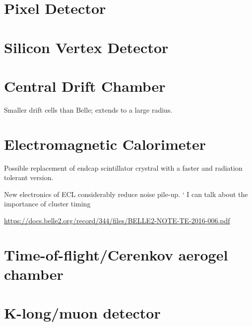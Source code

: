 \documentclass[12pt]{thesis}  %
\begin{document}

\section{Pixel Detector}



\section{Silicon Vertex Detector}




\section{Central Drift Chamber}

Smaller drift cells than Belle; extends to a large radius.



\section{Electromagnetic Calorimeter}

Possible replacement of endcap scintillator crystral with a faster and radiation tolerant version.

New electronics of ECL considerably reduce noise pile-up.
`
I can talk about the importance of cluster timing

\url{https://docs.belle2.org/record/344/files/BELLE2-NOTE-TE-2016-006.pdf}



\section{Time-of-flight/Cerenkov aerogel chamber}


\section{K-long/muon detector}

\end{document}
